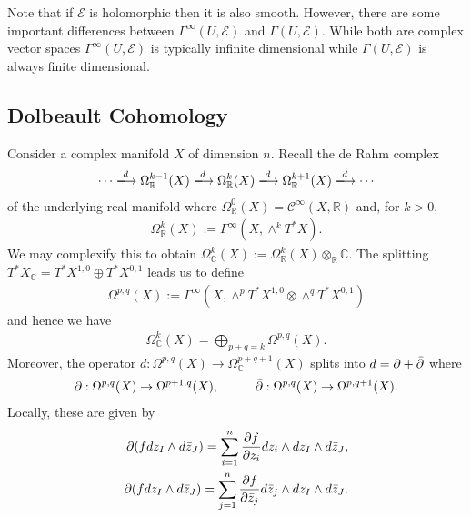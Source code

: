 \documentclass[12pt]{ociamthesis}  %
\begin{document}
Note that if $\mathcal E$ is holomorphic then it is also smooth.
However, there are some important differences between
$\Gamma^\infty(U,\mathcal E)$ and $\Gamma(U,\mathcal E)$. While both are
complex vector spaces $\Gamma^\infty(U,\mathcal E)$ is typically infinite
dimensional while $\Gamma(U,\mathcal E)$ is always finite
dimensional.~\cite[Theorem 1.4.1]{ma2007}

\subsection{Dolbeault Cohomology}

Consider a complex manifold $X$ of dimension $n$. Recall the de Rahm
complex
\begin{align*}
  \cdots \xlongrightarrow{d}
  \Omega_{\mathbb{R}}^{k-1}(X)\xlongrightarrow{d}
  \Omega_{\mathbb{R}}^{k}(X)\xlongrightarrow{d}
  \Omega_{\mathbb{R}}^{k+1}(X)\xlongrightarrow{d}
  \cdots
\end{align*}
of the underlying real manifold where
$\Omega^0_{\mathbb{R}}(X) = \mathscr C^\infty(X,\mathbb{R})$ and,
for $k > 0$,
\begin{align*}
  \Omega^k_{\mathbb{R}}(X) := \Gamma^\infty(X,\wedge^k T^*X).
\end{align*}
We may complexify this to obtain
$\Omega^k_{\mathbb C}(X) := \Omega^k_{\mathbb R}(X)\otimes_{\mathbb{R}} \mathbb{C}$.
The splitting $T^*X_\mathbb{C} = T^*X^{1,0} \oplus T^*X^{0,1}$
leads us to define
\begin{align*}
  \Omega^{p,q}(X)
  := \Gamma^\infty(X,\wedge^p T^*X^{1,0} \otimes\wedge^q T^*X^{0,1})
\end{align*}
and hence we have
\begin{align*}
  \Omega^k_{\mathbb C}(X) = \bigoplus_{p+q=k} \Omega^{p,q}(X).
\end{align*}
Moreover, the operator $d : \Omega^{p,q}(X) \to \Omega^{p+q+1}_{\mathbb C}(X)$
splits into $d = \partial + {\bar{\partial}}$ where
\begin{align*}
  \partial : \Omega^{p,q}(X) \to \Omega^{p+1,q}(X),\hspace{1cm}
  {\bar{\partial}} : \Omega^{p,q}(X) \to \Omega^{p,q+1}(X).
\end{align*}
Locally, these are given by
\begin{align*}
  \partial (f dz_I \wedge d\bar z_J) = \sum_{i=1}^n \frac{\partial f}{\partial z_i} dz_i\wedge dz_I \wedge d\bar z_J, \\
  {\bar{\partial}} (f dz_I \wedge d\bar z_J) = \sum_{j=1}^n \frac{\partial f}{\partial \bar z_j} d\bar z_j\wedge dz_I \wedge d\bar z_J.
\end{align*}
\end{document}
